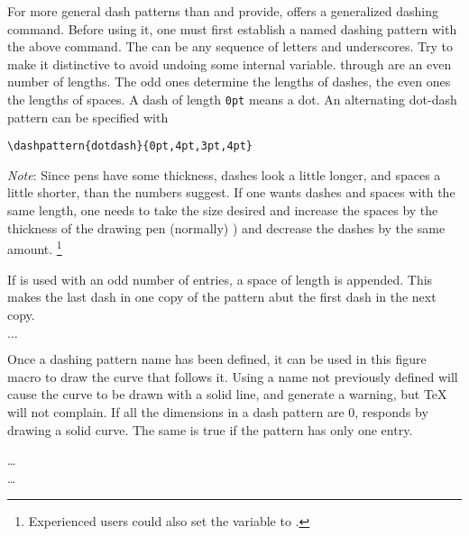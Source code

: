 \documentclass[letterpaper]{article}
\begin{document}
\begin{cd}
%
\end{cd}

For more general dash patterns than  and  provide,
\mfp{} offers a generalized dashing command. Before using it, one must
first establish a named dashing pattern with the above command. The
 can be any sequence of letters and underscores. Try to make
it distinctive to avoid undoing some internal variable. 
through  are an even number of lengths. The odd ones
determine the lengths of dashes, the even ones the lengths of spaces. A
dash of length \texttt{0pt} means a dot. An alternating dot-dash pattern
can be specified with
\begin{verbatim}
\dashpattern{dotdash}{0pt,4pt,3pt,4pt}
\end{verbatim}
\emph{Note}: Since pens have some thickness, dashes look a little
longer, and spaces a little shorter, than the numbers suggest. If one
wants dashes and spaces with the same length, one needs to take the size
desired and increase the spaces by the thickness of the drawing pen
(normally) \dim{0.5pt}) and decrease the dashes by the same amount.%
    \footnote{Experienced \MP{} users could also set the 
    variable to .}

If  is used with an odd number of entries, a space of
length \dim{0pt} is appended. This makes the last dash in one copy of
the pattern abut the first dash in the next copy.

\begin{cd}
$\ldots$%
\end{cd}

Once a dashing pattern name has been defined, it can be used in this
figure macro to draw the curve that follows it. Using a name not
previously defined will cause the curve to be drawn with a solid line,
and generate a \MF{} warning, but \TeX{} will not complain. If all the
dimensions in a dash pattern are 0,  responds by drawing a
solid curve. The same is true if the pattern has only one entry.

\begin{cd}
\dots\\
%
    \dots%
%
\end{cd}
\end{document}
